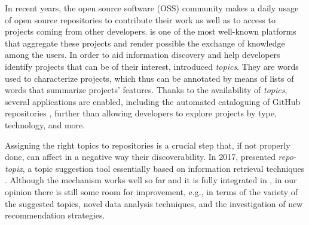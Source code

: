 In recent years, the open source software (OSS) community 
makes a daily usage of open source repositories to 
contribute their work as well as to access to projects 
coming from other developers. \GH is one of the most 
well-known platforms that aggregate these projects and 
render possible the exchange of knowledge among the users.
%
In order to aid information discovery and help 
developers identify projects that can be of their interest, \GH introduced \emph{topics}. They are 
words used to characterize projects, which thus can be 
annotated by means of lists of words that summarize projects' features. Thanks 
to the availability of \emph{topics}, several applications are enabled, 
including the automated cataloguing of GitHub repositories \cite{davidlo1}, 
further than allowing developers to explore projects by type, technology, and 
more.

Assigning the right topics to \GH repositories is a crucial step that, if not 
properly done, can affect in a negative way their discoverability. In 
2017, \GH presented \textit{repo-topix}, a topic suggestion tool essentially 
based on information retrieval techniques \cite{noauthor_topic_nodate}. 
Although the mechanism works well so far and it is fully integrated in \GH, in our 
opinion there is still some room for improvement, e.g., in terms of the variety 
of the suggested topics, novel data analysis techniques, and the investigation of new recommendation strategies.